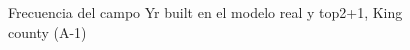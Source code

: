 \begin{figure}[H]
    \centering
    
    \caption{Frecuencia del campo Yr built en el modelo real y top2+1, King county (A-1)}
    \label{frecuency-top2+1-yr built}
\end{figure}